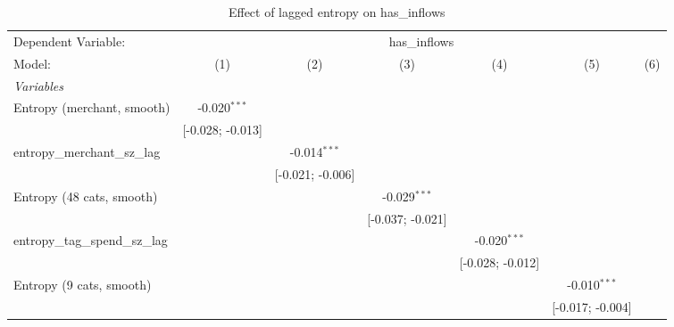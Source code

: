 
\begin{table}[htbp]
   \centering
   \tiny
   \begin{threeparttable}[b]
      \caption{\label{tab:reg_has_inflows_lagged_sz} Effect of lagged entropy on has\_inflows}
      \begin{tabular}{lcccccc}
         \tabularnewline \midrule \midrule
         Dependent Variable: & \multicolumn{6}{c}{has\_inflows}\\
         Model:                           & (1)              & (2)              & (3)              & (4)              & (5)              & (6)\\  
         \midrule
         \emph{Variables}\\
         Entropy (merchant, smooth)       & -0.020$^{***}$   &                  &                  &                  &                  &   \\   
                                          & [-0.028; -0.013] &                  &                  &                  &                  &   \\   
         entropy\_merchant\_sz\_lag       &                  & -0.014$^{***}$   &                  &                  &                  &   \\   
                                          &                  & [-0.021; -0.006] &                  &                  &                  &   \\   
         Entropy (48 cats, smooth)        &                  &                  & -0.029$^{***}$   &                  &                  &   \\   
                                          &                  &                  & [-0.037; -0.021] &                  &                  &   \\   
         entropy\_tag\_spend\_sz\_lag     &                  &                  &                  & -0.020$^{***}$   &                  &   \\   
                                          &                  &                  &                  & [-0.028; -0.012] &                  &   \\   
         Entropy (9 cats, smooth)         &                  &                  &                  &                  & -0.010$^{***}$   &   \\   
                                          &                  &                  &                  &                  & [-0.017; -0.004] &   \\   

\end{tabular}
\end{threeparttable}
\end{table}
